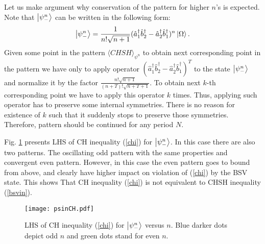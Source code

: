 \documentclass[aps,pra, twocolumn, showpacs]{revtex4-2}
\begin{document}
\begin{appendices}
Let us make argument why conservation of the pattern for higher $n$'s is expected. Note that $\ket{\psi_-^n}$ can be written in the following form:
\begin{equation}
\ket{\psi_-^n}=\frac{1}{n!\sqrt{n+1}}(\hat a_1^\dagger\hat b_2^\dagger-\hat a_2^\dagger\hat b_1^\dagger)^n\ket{\Omega}.    
\end{equation}
Given some  point in the pattern $\langle CHSH\rangle_{\psi^n}$ to obtain next corresponding point in the pattern we have only to apply operator $(\hat a_1^\dagger\hat b_2^\dagger-\hat a_2^\dagger\hat b_1^\dagger)^T$ to the state $\ket{\psi_-^n}$ and normalize it by the factor $\frac{n!\sqrt{n+1}}{(n+T)!\sqrt{n+T+1}}$. To obtain next $k$-th corresponding point we have to apply this operator $k$ times. Thus, applying such operator has to preserve some internal symmetries. 
There is no reason for existence of $k$ such that it suddenly stops to preserve those symmetries. Therefore, pattern should be continued for any period $N$.


Fig. \ref{psinch} presents LHS of CH inequality (\ref{chi}) for $\ket{\psi^n_-}$. In this case there are also two patterns. The oscillating odd pattern with the same properties and convergent even pattern. However, in this case the even pattern goes to bound from above, and clearly have higher impact on violation of  (\ref{chi}) by the BSV state. This shows That CH inequality (\ref{chi}) is not equivalent to CHSH inequality (\ref{bsvin}).

\begin{figure}[ht!]
\centering
\texttt{[image: psinCH.pdf]} 
\caption{LHS of CH inequality (\ref{chi}) for $\ket{\psi^n_-}$ versus $n$. Blue darker dots depict odd $n$ and green dots stand for even $n$.}
\label{psinch}
\end{figure}


\end{appendices}




%

\end{document}
